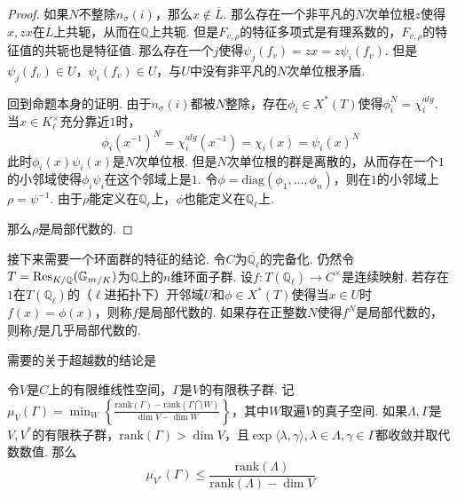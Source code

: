 \begin{proof}
    如果$N$不整除$n_{\sigma}(i)$，那么$x\not\in \overline{L}$. 那么存在一个非平凡的$N$次单位根$z$使得$x, zx$在$\overline{L}$上共轭，从而在$\mathbb{Q}$上共轭. 但是$F_{v,\rho}$的特征多项式是有理系数的，$F_{v,\rho}$的特征值的共轭也是特征值. 那么存在一个$j$使得$\psi_j(f_v) = zx = z\psi_i(f_v)$. 但是$\psi_j(f_v)\in U$，$\psi_i(f_v)\in U$，与$U$中没有非平凡的$N$次单位根矛盾.

    \vskip0.3cm

    回到命题本身的证明. 由于$n_{\sigma}(i)$都被$N$整除，存在$\phi_i\in X^{*}(T)$使得$\phi_i^N = \chi_i^{alg}$. 当$x\in K_{\ell}^{\times}$充分靠近$1$时，
    \begin{equation}
        \phi_i(x^{-1})^N = \chi_i^{alg}(x^{-1}) = \chi_i(x) = \psi_i(x)^N
    \end{equation}
    此时$\phi_i(x)\psi_i(x)$是$N$次单位根. 但是$N$次单位根的群是离散的，从而存在一个$1$的小邻域使得$\phi_i\psi_i$在这个邻域上是$1$. 令$\phi=\mathrm{diag}(\phi_1,\ldots,\phi_n)$，则在$1$的小邻域上$\rho = \psi^{-1}$. 由于$\rho$能定义在$\mathbb{Q}_{\ell}$上，$\phi$也能定义在$\mathbb{Q}_{\ell}$上.

    那么$\rho$是局部代数的.
\end{proof}

接下来需要一个环面群的特征的结论.
令$C$为$\overline{\mathbb{Q}_{\ell}}$的完备化. 仍然令$T=\mathrm{Res}_{K/\mathbb{Q}}({\mathbb{G}_m}_{/K})$为$\mathbb{Q}$上的$n$维环面子群.
设$f: T(\mathbb{Q}_{\ell})\to C^{\times}$是连续映射. 若存在$1$在$T(\mathbb{Q}_{\ell})$的（$\ell$进拓扑下）开邻域$U$和$\phi\in X^{*}(T)$使得当$x\in U$时$f(x)=\phi(x)$，则称$f$是局部代数的. 如果存在正整数$N$使得$f^N$是局部代数的，则称$f$是几乎局部代数的.

需要的关于超越数的结论是
\begin{cprop}
    令$V$是$C$上的有限维线性空间，$\Gamma$是$V$的有限秩子群. 记$\mu_{V}(\Gamma) = \min_W \left\{ \frac{\mathrm{rank}(\Gamma) - \mathrm{rank}(\Gamma \bigcap W)}{\dim V-\dim W} \right\}$，其中$W$取遍$V$的真子空间. 如果$\Lambda, \Gamma$是$V, V^{*}$的有限秩子群，$\mathrm{rank}(\Gamma)>\dim V$，且$\exp\langle \lambda, \gamma\rangle, \lambda \in \Lambda, \gamma\in \Gamma$都收敛并取代数数值. 那么
    \begin{equation}
        \mu_{V^{*}}(\Gamma)\leq \frac{\mathrm{rank}(\Lambda)}{\mathrm{rank}(\Lambda) - \dim V}
    \end{equation}\label{temp::theo8}
\end{cprop}

